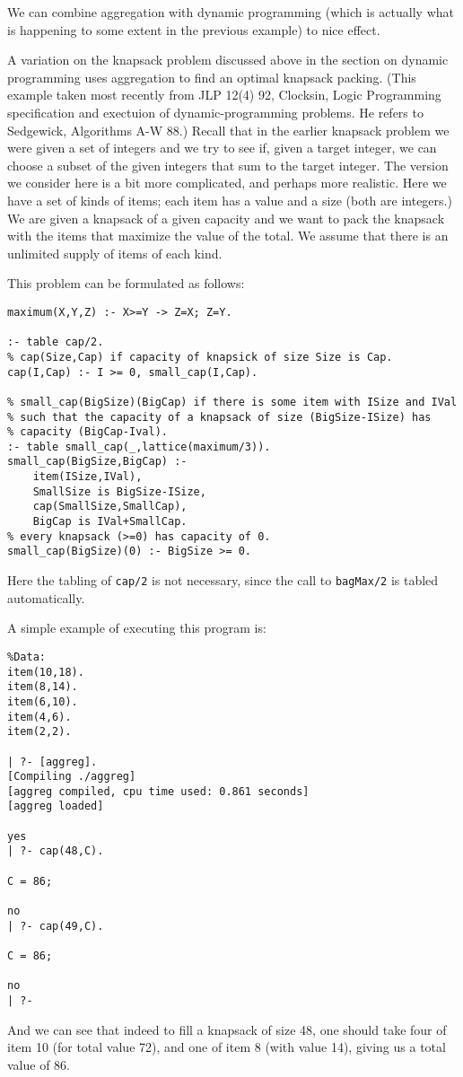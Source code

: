 We can combine aggregation with dynamic programming (which is actually
what is happening to some extent in the previous example) to nice
effect.

A variation on the knapsack problem discussed above in the section on
dynamic programming uses aggregation to find an optimal knapsack
packing.  (This example taken most recently from JLP 12(4) 92,
Clocksin, Logic Programming specification and exectuion of
dynamic-programming problems. He refers to Sedgewick, Algorithms A-W
88.)  Recall that in the earlier knapsack problem we were given a set
of integers and we try to see if, given a target integer, we can
choose a subset of the given integers that sum to the target integer.
The version we consider here is a bit more complicated, and perhaps
more realistic.  Here we have a set of kinds of items; each item has a
value and a size (both are integers.)  We are given a knapsack of a
given capacity and we want to pack the knapsack with the items that
maximize the value of the total.  We assume that there is an unlimited
supply of items of each kind.

This problem can be formulated as follows:
\begin{verbatim}
maximum(X,Y,Z) :- X>=Y -> Z=X; Z=Y.

:- table cap/2.
% cap(Size,Cap) if capacity of knapsick of size Size is Cap.
cap(I,Cap) :- I >= 0, small_cap(I,Cap).

% small_cap(BigSize)(BigCap) if there is some item with ISize and IVal
% such that the capacity of a knapsack of size (BigSize-ISize) has
% capacity (BigCap-Ival).
:- table small_cap(_,lattice(maximum/3)).
small_cap(BigSize,BigCap) :- 
	item(ISize,IVal),
	SmallSize is BigSize-ISize,
	cap(SmallSize,SmallCap),
	BigCap is IVal+SmallCap.
% every knapsack (>=0) has capacity of 0.
small_cap(BigSize)(0) :- BigSize >= 0.
\end{verbatim}
Here the tabling of \verb|cap/2| is not necessary, since the call to
\verb|bagMax/2| is tabled automatically.

A simple example of executing this program is:
\begin{verbatim}
%Data:
item(10,18).
item(8,14).
item(6,10).
item(4,6).
item(2,2).

| ?- [aggreg].
[Compiling ./aggreg]
[aggreg compiled, cpu time used: 0.861 seconds]
[aggreg loaded]

yes
| ?- cap(48,C).

C = 86;

no
| ?- cap(49,C).

C = 86;

no
| ?- 
\end{verbatim}
And we can see that indeed to fill a knapsack of size 48, one should
take four of item 10 (for total value 72), and one of item 8 (with
value 14), giving us a total value of 86.

